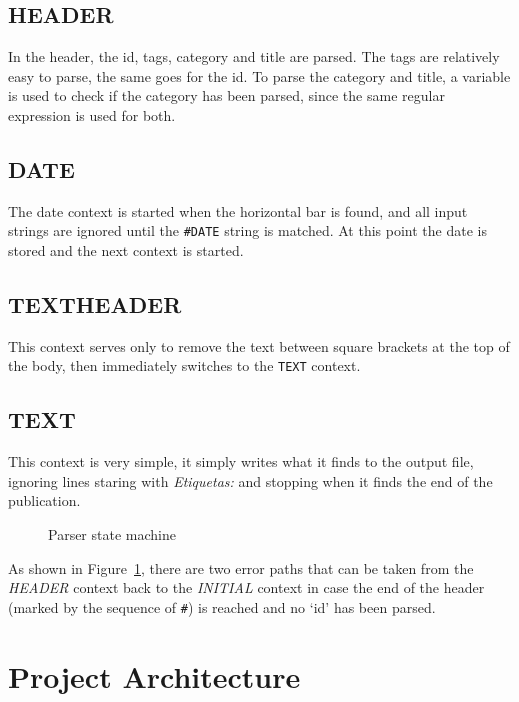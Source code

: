 \documentclass[a4paper]{report}
\begin{document}
\subsection{HEADER}

In the header, the id, tags, category and title are parsed. The tags are
relatively easy to parse, the same goes for the id. To parse the category and
title, a variable is used to check if the category has been parsed, since the
same regular expression is used for both.

\subsection{DATE}

The date context is started when the horizontal bar is found, and all input
strings are ignored until the \texttt{\#DATE} string is matched. At this point
the date is stored and the next context is started.

\subsection{TEXTHEADER}

This context serves only to remove the text between square brackets at the top
of the body, then immediately switches to the \texttt{TEXT} context.

\subsection{TEXT}

This context is very simple, it simply writes what it finds to the output file,
ignoring lines staring with \textit{Etiquetas:} and stopping when it finds the
end of the publication.

\begin{figure}[H]
    
    \caption{Parser state machine}\label{fig:parser_state_machine}
\end{figure}

As shown in Figure~\ref{fig:parser_state_machine}, there are two error paths
that can be taken from the \textit{HEADER} context back to the \textit{INITIAL}
context in case the end of the header (marked by the sequence of \verb!#!) is
reached and no `id' has been parsed.

\section{Project Architecture}
\end{document}
